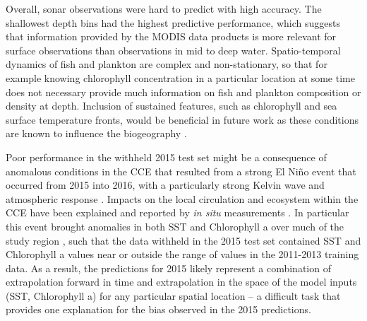 \documentclass[10pt,letterpaper]{article}
\begin{document}
Overall, sonar observations were hard to predict with high accuracy.
The shallowest depth bins had the highest predictive performance, which suggests that information provided by the MODIS data products is more relevant for surface observations than observations in mid to deep water.
Spatio-temporal dynamics of fish and plankton are complex and non-stationary, so that for example knowing chlorophyll concentration in a particular location at some time does not necessary provide much information on fish and plankton composition or density at depth. 
Inclusion of sustained features, such as chlorophyll and sea surface temperature fronts, would be beneficial in future work as these conditions are known to influence the biogeography \cite{taylor2012sharp} \cite{powell2015covariability}.

Poor performance in the withheld 2015 test set might be a consequence of anomalous conditions in the CCE that resulted from a strong El Ni\~no event that occurred from 2015 into 2016, with a particularly strong Kelvin wave and atmospheric response \cite{chen2017formation, hu2017extreme}. 
Impacts on the local circulation and ecosystem within the CCE have been explained \cite{jacox2016impacts} and reported by \emph{in situ} measurements \cite{zaba2020volume}. In particular this event brought anomalies in both SST and Chlorophyll a over much of the study region \cite{jacox2016impacts}, such that the data withheld in the 2015 test set contained SST and Chlorophyll a values near or outside the range of values in the 2011-2013 training data. As a result, the predictions for 2015 likely represent a combination of extrapolation forward in time and extrapolation in the space of the model inputs (SST, Chlorophyll a) for any particular spatial location -- a difficult task that provides one explanation for the bias observed in the 2015 predictions. 
\end{document}
